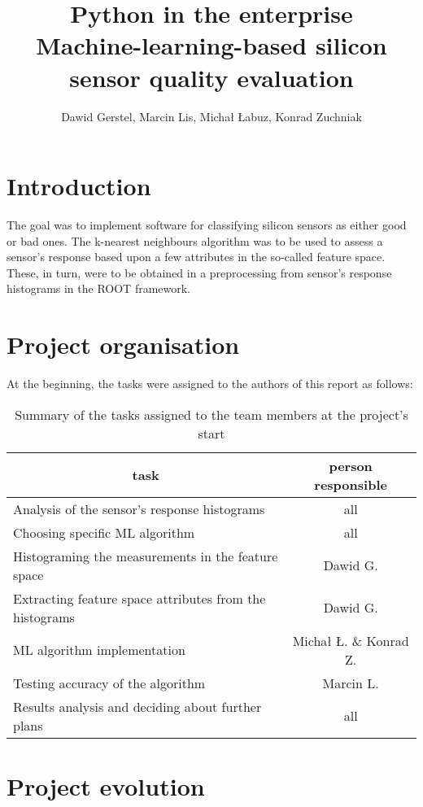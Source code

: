 \documentclass[a4paper,10pt]{article}
\title{\textbf{Python in the enterprise} \\ Machine-learning-based silicon sensor quality evaluation}
\author{Dawid Gerstel, Marcin Lis, Michał Łabuz, Konrad Zuchniak}
\begin{document}
\maketitle



\newpage

\section{Introduction}

The goal was to implement software for classifying silicon sensors as either good or bad ones. The k-nearest neighbours algorithm was to be used to assess a sensor's response 
based upon a few attributes in the so-called feature space. These, in turn, were to be obtained in a preprocessing from sensor's response histograms in the ROOT framework.

\section{Project organisation}
At the beginning, the tasks were assigned to the authors of this report as follows:

\begin{table}[H]
\centering
\begin{tabular}{@{}lc@{}} \toprule %
\multicolumn{1}{c}{task}& person responsible \\ \toprule
Analysis of the sensor's response histograms & all \\
Choosing specific ML algorithm & all \\
Histograming the measurements in the feature space & Dawid G. \\
Extracting feature space attributes from the histograms & Dawid G. \\
ML algorithm implementation & Michał Ł. \& Konrad Z. \\
Testing accuracy of the algorithm & Marcin L. \\
Results analysis and deciding about further plans & all \\
\bottomrule
\end{tabular}
\caption{Summary of the tasks assigned to the team members at the project's start}
\label{t:tasks}
\end{table}

\section{Project evolution}
\end{document}
